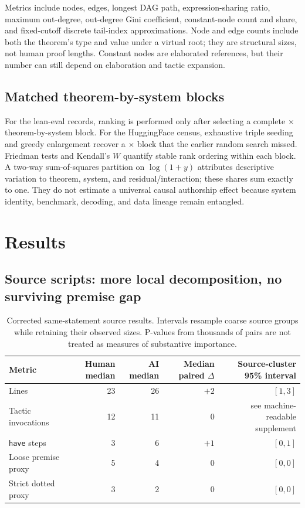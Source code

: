 \documentclass[11pt]{article}
\newcommand{\code}[1]{\texttt{#1}}
\begin{document}
Metrics include nodes, edges, longest DAG path, expression-sharing ratio, maximum out-degree,
out-degree Gini coefficient, constant-node count and share, and fixed-cutoff discrete tail-index
approximations.  Node and edge counts include both the theorem's type and value under a virtual root;
they are structural sizes, not human proof lengths.  Constant nodes are elaborated references, but
their number can still depend on elaboration and tactic expansion.

\subsection{Matched theorem-by-system blocks}

For the lean-eval records, ranking is performed only after selecting a complete
\LeanBlockN$\times$\LeanBlockK{} theorem-by-system block.  For the HuggingFace census, exhaustive
triple seeding and greedy enlargement recover a \HFBlockN$\times$\HFBlockK{} block that the earlier
random search missed.  Friedman tests and Kendall's $W$ quantify stable rank ordering within each
block.  A two-way sum-of-squares partition on $\log(1+y)$ attributes descriptive variation to
theorem, system, and residual/interaction; these shares sum exactly to one.  They do not estimate a
universal causal authorship effect because system identity, benchmark, decoding, and data lineage
remain entangled.

\section{Results}

\subsection{Source scripts: more local decomposition, no surviving premise gap}

\begin{table}[!htbp]
\centering
\caption{Corrected same-statement source results.  Intervals resample coarse source groups while
retaining their observed sizes.  P-values from thousands of pairs are not treated as measures of
substantive importance.}
\label{tab:source}
\small
\setlength{\tabcolsep}{4pt}
\begin{tabular}{lrrrr}
\toprule
Metric & Human median & AI median & Median paired $\Delta$ & Source-cluster 95\% interval \\
\midrule
Lines & 23 & 26 & $+2$ & $[1,3]$ \\
Tactic invocations & 12 & 11 & $0$ & see machine-readable supplement \\
\code{have} steps & 3 & 6 & $+1$ & $[0,1]$ \\
Loose premise proxy & 5 & 4 & $0$ & $[0,0]$ \\
Strict dotted proxy & 3 & 2 & $0$ & $[0,0]$ \\
\bottomrule
\end{tabular}
\end{table}
\end{document}
